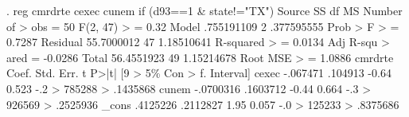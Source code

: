 . reg cmrdrte cexec cunem if (d93==1 \& state!="TX")
{\smallskip}
      Source {\VBAR}       SS           df       MS      Number of
>  obs   =        50
   F(2, 47) 
>        =      0.32
       Model {\VBAR}  .755191109         2  .377595555   Prob > F 
>        =    0.7287
    Residual {\VBAR}  55.7000012        47  1.18510641   R-squared
>        =    0.0134
   Adj R-squ
> ared   =   -0.0286
       Total {\VBAR}  56.4551923        49  1.15214678   Root MSE 
>        =    1.0886
{\smallskip}
     cmrdrte {\VBAR}      Coef.   Std. Err.      t    P>|t|     [9
> 5\% Con                                                    
>       f. Interval]
       cexec {\VBAR}   -.067471    .104913    -0.64   0.523    -.2
> 785288                                                    
>           .1435868
       cunem {\VBAR}  -.0700316   .1603712    -0.44   0.664    -.3
> 926569                                                    
>           .2525936
       _cons {\VBAR}   .4125226   .2112827     1.95   0.057    -.0
> 125233                                                    
>           .8375686
{\smallskip}
